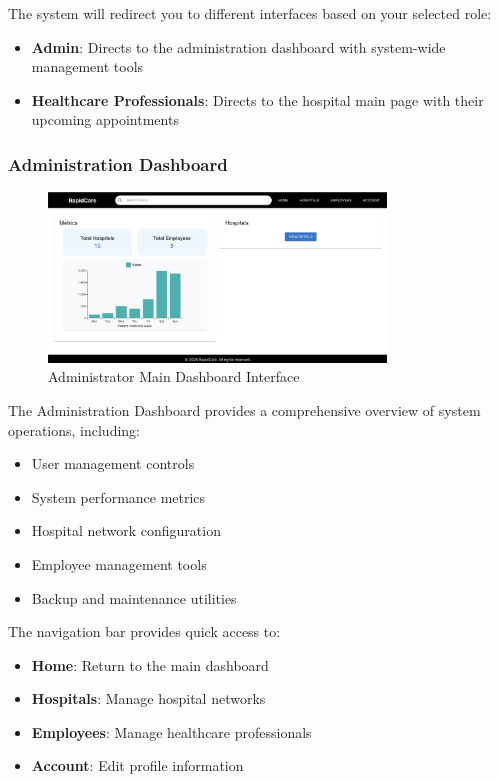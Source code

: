 \documentclass[12pt, titlepage]{article}
\begin{document}
The system will redirect you to different interfaces based on your selected role:
\begin{itemize}
\item \textbf{Admin}: Directs to the administration dashboard with system-wide management tools
\item \textbf{Healthcare Professionals}: Directs to the hospital main page with their upcoming appointments
\end{itemize}

\subsubsection{Administration Dashboard}
\begin{figure}[H]
\centering
\includegraphics[width=0.8\textwidth]{admin.png}
\caption{Administrator Main Dashboard Interface}
\label{fig:admin_dashboard}
\end{figure}

The Administration Dashboard provides a comprehensive overview of system operations, including:
\begin{itemize}
\item User management controls
\item System performance metrics
\item Hospital network configuration
\item Employee management tools
\item Backup and maintenance utilities
\end{itemize}

The navigation bar provides quick access to:
\begin{itemize}
\item \textbf{Home}: Return to the main dashboard
\item \textbf{Hospitals}: Manage hospital networks
\item \textbf{Employees}: Manage healthcare professionals
\item \textbf{Account}: Edit profile information
\end{itemize}
\end{document}
